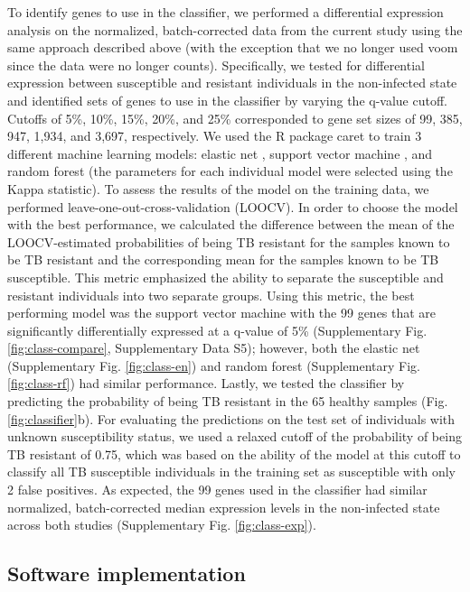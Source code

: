 \documentclass[fleqn,10pt]{wlscirep}
\begin{document}
To identify genes to use in the classifier, we performed a
differential expression analysis on the normalized, batch-corrected
data from the current study using the same approach described above
(with the exception that we no longer used voom \cite{Law2014} since
the data were no longer counts). Specifically, we tested for
differential expression between susceptible and resistant individuals
in the non-infected state and identified sets of genes to use in the
classifier by varying the q-value cutoff. Cutoffs of 5\%, 10\%, 15\%,
20\%, and 25\% corresponded to gene set sizes of 99, 385, 947, 1,934,
and 3,697, respectively. We used the R package caret \cite{Kuhn2008}
to train 3 different machine learning models: elastic net
\cite{Friedman2010}, support vector machine \cite{Karatzoglou2004},
and random forest \cite{Liaw2002} (the parameters for each individual
model were selected using the Kappa statistic). To assess the results
of the model on the training data, we performed
leave-one-out-cross-validation (LOOCV). In order to choose the model
with the best performance, we calculated the difference between the
mean of the LOOCV-estimated probabilities of being TB resistant for
the samples known to be TB resistant and the corresponding mean for
the samples known to be TB susceptible. This metric emphasized the
ability to separate the susceptible and resistant individuals into two
separate groups. Using this metric, the best performing model was the
support vector machine with the 99 genes that are significantly
differentially expressed at a q-value of 5\% (Supplementary Fig.
\ref{fig:class-compare}, Supplementary Data S5); however, both the
elastic net (Supplementary Fig. \ref{fig:class-en}) and random forest
(Supplementary Fig. \ref{fig:class-rf}) had similar performance.
Lastly, we tested the classifier by predicting the probability of
being TB resistant in the 65 healthy samples (Fig.
\ref{fig:classifier}b). For evaluating the predictions on the test set
of individuals with unknown susceptibility status, we used a relaxed
cutoff of the probability of being TB resistant of 0.75, which was
based on the ability of the model at this cutoff to classify all TB
susceptible individuals in the training set as susceptible with only 2
false positives. As expected, the 99 genes used in the classifier had
similar normalized, batch-corrected median expression levels in the
non-infected state across both studies (Supplementary Fig.
\ref{fig:class-exp}).
\subsection*{Software implementation}
\end{document}
